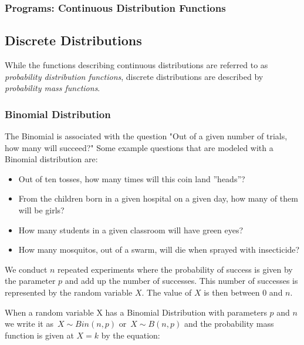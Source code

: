 \subsubsection{ Programs: Continuous Distribution Functions }
%


\subsection{Discrete Distributions}

While the functions describing continuous distributions are referred to as \emph{probability distribution functions}, discrete distributions are described by \emph{probability mass functions}.

\subsubsection{Binomial Distribution}
The Binomial is associated with the question "Out of a given number of trials, how many will succeed?" Some example questions that are modeled with a Binomial distribution are:
\begin{itemize}
  \item Out of ten tosses, how many times will this coin land ''heads''?
  \item From the children born in a given hospital on a given day, how many of them will be girls?
  \item How many students in a given classroom will have green eyes?
  \item How many mosquitos, out of a swarm, will die when sprayed with insecticide?
\end{itemize}

  We conduct $n$ repeated experiments where the probability of success is given by the parameter $p$ and add up the number of successes. This number of successes is represented by the random variable $X$.  The value of $X$ is then between 0 and $n$.

When a random variable X has a Binomial Distribution with parameters $p$ and $n$ we write it as $\,X \sim Bin(n,p)$ or $\,X \sim B(n,p)$ and the probability mass function is given at $X=k$ by the equation:

